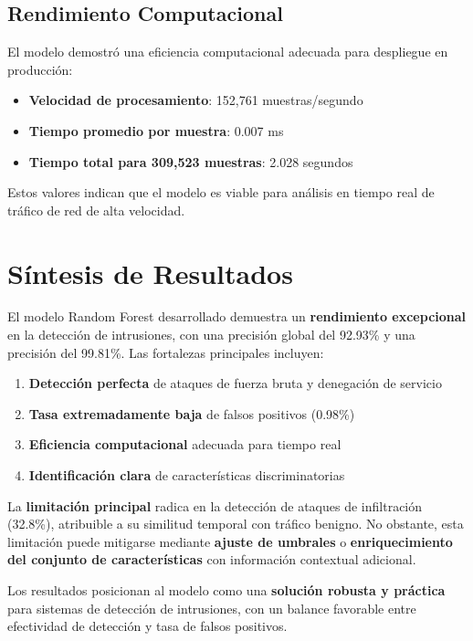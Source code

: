 \subsection{Rendimiento Computacional}\label{res:rendimientocom}

El modelo demostró una eficiencia computacional adecuada para despliegue en producción:

\begin{itemize}
\item \textbf{Velocidad de procesamiento}: 152,761 muestras/segundo
\item \textbf{Tiempo promedio por muestra}: 0.007 ms
\item \textbf{Tiempo total para 309,523 muestras}: 2.028 segundos
\end{itemize}

Estos valores indican que el modelo es viable para análisis en tiempo real de tráfico de red de alta velocidad.

\section{Síntesis de Resultados}

El modelo Random Forest desarrollado demuestra un \textbf{rendimiento excepcional} en la detección de intrusiones, con una precisión global del 92.93\% y una precisión del 99.81\%. Las fortalezas principales incluyen:

\begin{enumerate}
\item \textbf{Detección perfecta} de ataques de fuerza bruta y denegación de servicio
\item \textbf{Tasa extremadamente baja} de falsos positivos (0.98\%)
\item \textbf{Eficiencia computacional} adecuada para tiempo real
\item \textbf{Identificación clara} de características discriminatorias
\end{enumerate}

La \textbf{limitación principal} radica en la detección de ataques de infiltración (32.8\%), atribuible a su similitud temporal con tráfico benigno. No obstante, esta limitación puede mitigarse mediante \textbf{ajuste de umbrales} o \textbf{enriquecimiento del conjunto de características} con información contextual adicional.

Los resultados posicionan al modelo como una \textbf{solución robusta y práctica} para sistemas de detección de intrusiones, con un balance favorable entre efectividad de detección y tasa de falsos positivos.

